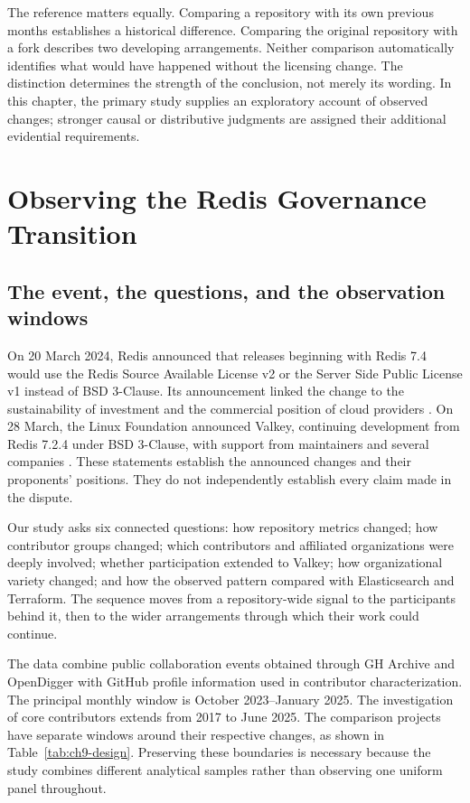 The reference matters equally. Comparing a repository with its own previous months establishes a historical difference. Comparing the original repository with a fork describes two developing arrangements. Neither comparison automatically identifies what would have happened without the licensing change. The distinction determines the strength of the conclusion, not merely its wording. In this chapter, the primary study supplies an exploratory account of observed changes; stronger causal or distributive judgments are assigned their additional evidential requirements.

\section{Observing the Redis Governance Transition}
\label{sec:ch9-redis}

\subsection{The event, the questions, and the observation windows}
On 20 March 2024, Redis announced that releases beginning with Redis 7.4 would use the Redis Source Available License v2 or the Server Side Public License v1 instead of BSD 3-Clause. Its announcement linked the change to the sustainability of investment and the commercial position of cloud providers \citep{redis2024}. On 28 March, the Linux Foundation announced Valkey, continuing development from Redis 7.2.4 under BSD 3-Clause, with support from maintainers and several companies \citep{valkey2024}. These statements establish the announced changes and their proponents' positions. They do not independently establish every claim made in the dispute.

Our study \citep{han2026redis} asks six connected questions: how repository metrics changed; how contributor groups changed; which contributors and affiliated organizations were deeply involved; whether participation extended to Valkey; how organizational variety changed; and how the observed pattern compared with Elasticsearch and Terraform. The sequence moves from a repository-wide signal to the participants behind it, then to the wider arrangements through which their work could continue.

The data combine public collaboration events obtained through GH Archive and OpenDigger with GitHub profile information used in contributor characterization. The principal monthly window is October 2023--January 2025. The investigation of core contributors extends from 2017 to June 2025. The comparison projects have separate windows around their respective changes, as shown in Table~\ref{tab:ch9-design}. Preserving these boundaries is necessary because the study combines different analytical samples rather than observing one uniform panel throughout.

